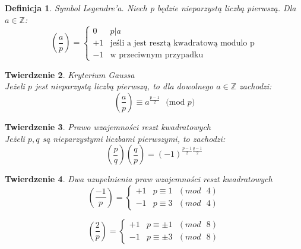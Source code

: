 \documentclass[10pt,a4paper]{article}
\newtheorem{theorem}{Twierdzenie}[section]
\newtheorem{defi}[theorem]{Definicja}
\newcommand{\Z}{\mathbb{Z}}
\newcommand{\legendre}[2]{\genfrac{(}{)}{}{}{#1}{#2}}
\begin{document}
\begin{defi}{Symbol Legendre'a.}
	\color{black}
	Niech p będzie nieparzystą liczbą pierwszą. Dla $a \in \Z$:
	$$
	\legendre{a}{p} =
	\left\{ \begin{array}{ll}
	0 & p|a \\
	+1 & \textrm{jeśli a jest resztą kwadratową modulo p} \\
	-1 & \textrm{w przeciwnym przypadku}
	\end{array} \right.	
	$$
\end{defi}
\begin{theorem}{Kryterium Gaussa}
	\color{black}
	\\
	Jeżeli $p$ jest nieparzystą liczbą pierwszą, to dla dowolnego $a \in \Z$ zachodzi:
	$$\legendre{a}{p} \equiv a^{\frac{p-1}{2}}\textrm{ $($mod }p)$$
\end{theorem}
\begin{theorem}{Prawo wzajemności reszt kwadratowych}
	\color{black}
	\\
	Jeżeli $p,q$ są nieparzystymi liczbami pierwszymi, to zachodzi:
	$$\legendre{p}{q}\legendre{q}{p} = (-1)^{\frac{p-1}{2}\frac{q-1}{2}}$$
\end{theorem}
\begin{theorem}{Dwa uzupełnienia praw wzajemności reszt kwadratowych}
	\color{black}
	\\
	$$
	\legendre{-1}{p} =
	\left\{ \begin{array}{ll}
	+1 & p \equiv 1 \textrm{ }(mod\textrm{ }4) \\
	-1 & p \equiv 3 \textrm{ }(mod\textrm{ }4)
	\end{array} \right.	
	$$
		
	$$
	\legendre{2}{p} =
	\left\{ \begin{array}{ll}
	+1 & p \equiv \pm 1 \textrm{ }(mod\textrm{ }8) \\
	-1 & p \equiv \pm 3 \textrm{ }(mod\textrm{ }8)
	\end{array} \right.	
	$$	
\end{theorem}
\end{document}
